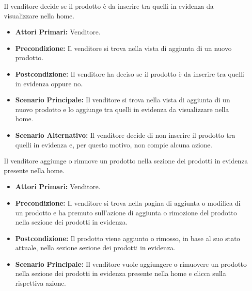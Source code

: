 Il venditore decide se il prodotto è da inserire tra quelli in evidenza da visualizzare nella home.
\begin{itemize}
    \item \textbf{Attori Primari:} Venditore.
    \item \textbf{Precondizione:} Il venditore si trova nella vista di aggiunta di un nuovo prodotto.
    \item \textbf{Postcondizione:} Il venditore ha deciso se il prodotto è da inserire tra quelli in evidenza oppure no.
    \item \textbf{Scenario Principale:} Il venditore si trova nella vista di aggiunta di un nuovo prodotto e lo aggiunge tra quelli in evidenza da visualizzare nella home.
    \item \textbf{Scenario Alternativo:} Il venditore decide di non inserire il prodotto tra quelli in evidenza e, per questo motivo, non compie alcuna azione.
\end{itemize}


Il venditore aggiunge o rimuove un prodotto nella sezione dei prodotti in evidenza presente nella home.
\begin{itemize}
    \item \textbf{Attori Primari:} Venditore.
    \item \textbf{Precondizione:} Il venditore si trova nella pagina di aggiunta o modifica di un prodotto e ha premuto sull'azione di aggiunta o rimozione del prodotto nella sezione dei prodotti in evidenza.
    \item \textbf{Postcondizione:} Il prodotto viene aggiunto o rimosso, in base al suo stato attuale, nella sezione sezione dei prodotti in evidenza. 
    \item \textbf{Scenario Principale:} Il venditore vuole aggiungere o rimuovere un prodotto nella sezione dei prodotti in evidenza presente nella home e clicca sulla rispettiva azione.
\end{itemize}


